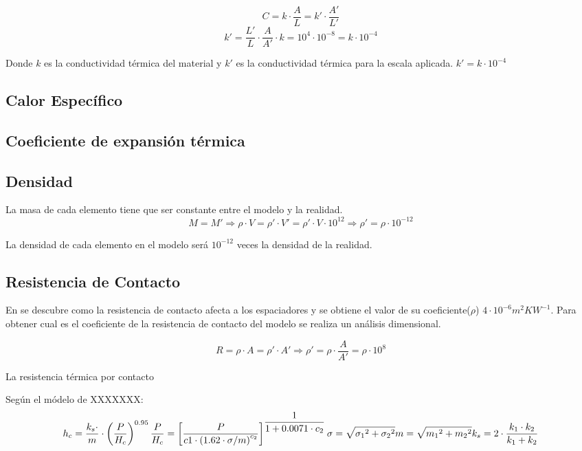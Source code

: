 \begin{equation}
	C=k\cdot \frac{A}{L}=k'\cdot\frac{A'}{L'}
\end{equation}
\begin{equation}	
	 k'=\dfrac{L'}{L} \cdot \dfrac{A}{A'} \cdot k=10^4\cdot 10^{-8}=k\cdot 10^{-4}
\end{equation}

Donde $k$ es la conductividad térmica del material  y $k'$ es la conductividad térmica para la escala aplicada. $k'=k\cdot10^{-4}$

\subsection{Calor Específico}

\subsection{Coeficiente de expansión térmica}

\subsection{Densidad}
La masa de cada elemento tiene que ser constante entre el modelo y la realidad.
\begin{equation}
	M=M'\Longrightarrow \rho\cdot V=\rho'\cdot V'= \rho'\cdot V\cdot {10}^{12}\Longrightarrow \rho'=\rho\cdot{10}^{-12}
\end{equation}

La densidad de cada elemento en el modelo será $10^{-12}$ veces la densidad de la realidad.

\subsection{Resistencia de Contacto}
En \cite{noauthor_parallel-plate_nodate} se descubre como la resistencia de contacto afecta a los espaciadores y se obtiene el valor de su coeficiente($\rho$) $4\cdot 10^{-6}m^2 KW^{-1} $. Para obtener cual es el coeficiente de la resistencia de contacto del modelo se realiza un análisis dimensional.

\begin{equation}
	R= \rho \cdot A =\rho ' \cdot A' \Longrightarrow \rho '=\rho \cdot \dfrac{A}{A'}=\rho \cdot 10^8
\end{equation}

La resistencia térmica por contacto

Según el módelo de XXXXXXX:
\begin{equation}
	h_c=\dfrac{k_s\cdot}{m}\cdot \left( \dfrac{P}{H_c} \right)^{0.95} \\ \dfrac{P}{H_c} = \left[ \dfrac{P}{c1\cdot \left(1.62\cdot \sigma/m \right)^{c_2}}\right]^{\dfrac{1}{1+0.0071\cdot c_2}} \\	\sigma =\sqrt{{\sigma_1}^2+{\sigma_2}^2} \\ m=\sqrt{{m_1}^2+{m_2}^2}	\\ k_s=2\cdot \dfrac{k_1\cdot k_2}{k_1+k_2}
\end{equation}

